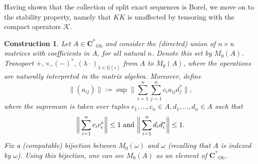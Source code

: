 \documentclass[12pt]{amsart}
\newtheorem{construction}[theorem]{Construction}
\DeclareMathOperator{\Ob}{Ob}
\newcommand{\Cstar}{\mathbf{C^*}} %
\begin{document}
Having shown that the collection of split exact sequences is Borel, we move on to the stability property, namely that $KK$ is unaffected by tensoring with the compact operators $\mathcal{K}$.

\begin{construction}\label{construction:matrix_amplifications}
    Let $A \in \Cstar_{\Ob}$ and consider the (directed) union of $n \times n$ matrices with coefficients in $A$, for all natural $n$. Denote this set by $M_0(A)$. Transport $+,\times, (-)^*, (\lambda \cdot)_{\lambda \in \mathbb{Q}(i)}$ from $A$ to $M_0(A)$, where the operations are naturally interpreted in the matrix algebra. Moreover, define
    \[ \| (a_{ij}) \| := \sup \bigg\| \sum_{i=1}^n \sum_{j=1}^n c_i a_{ij} d_j^* \bigg\|, \]
    where the supremum is taken over tuples $c_1, \dots, c_n \in A, d_1, \dots, d_n \in A$ such that
    \[ \bigg\| \sum_{i=1}^n c_i c_i^* \bigg\| \leq 1 \textnormal{ and } \bigg\| \sum_{i=1}^n d_i d_i^* \bigg\| \leq 1. \]
    Fix a (computable) bijection between $M_0(\omega)$ and $\omega$ (recalling that $A$ is indexed by $\omega$). 
    Using this bijection, one can see $M_0(A)$ as an element of $\Cstar_{\Ob}$.
\end{construction}
\end{document}
